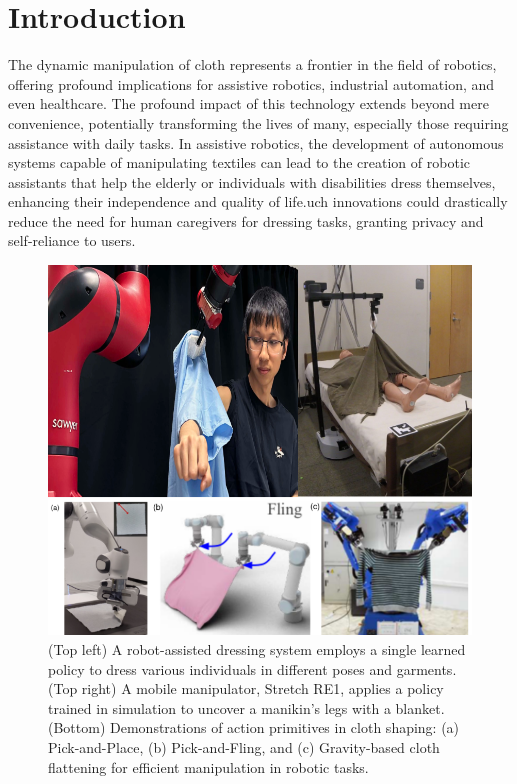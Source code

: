 \documentclass[subscriptcorrection,upint,varvw,barcolor=Goldenrod3,mathalfa=cal=euler,balance,hyphenate,french,pdf-a, nofoot]{asmejour} %
\begin{document}
\section{Introduction}

The dynamic manipulation of cloth represents a frontier in the field of robotics, offering profound implications for assistive robotics, industrial automation, and even healthcare\cite{doumanoglou2014autonomous, maitin2010cloth, erickson2018deep, erickson2018tracking, erickson2020assistive, yu2017haptic}. The profound impact of this technology extends beyond mere convenience, potentially transforming the lives of many, especially those requiring assistance with daily tasks. In assistive robotics, the development of autonomous systems capable of manipulating textiles can lead to the creation of robotic assistants that help the elderly or individuals with disabilities dress themselves, enhancing their independence and quality of life.uch innovations could drastically reduce the need for human caregivers for dressing tasks, granting privacy and self-reliance to users.
\begin{figure}
\centering
\includegraphics[width=\columnwidth]{CLOTH REPORT PICS/high_level.png}
\caption[Robotic Cloth Manipulation]{(Top left) A robot-assisted dressing system employs a single learned policy to dress various individuals in different poses and garments\cite{Wang2023One}. (Top right) A mobile manipulator, Stretch RE1, applies a policy trained in simulation to uncover a manikin's legs with a blanket\cite{puthuveetil2022bodies}. (Bottom) Demonstrations of action primitives in cloth shaping: (a) Pick-and-Place\cite{lee2021learning}, (b) Pick-and-Fling\cite{ha2022flingbot}, and (c) Gravity-based cloth flattening for efficient manipulation in robotic tasks\cite{doumanoglou2014autonomous}.}
\label{fig:robotic_cloth_manipulation}
\end{figure}
\end{document}
